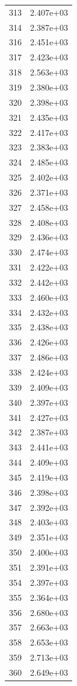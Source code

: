 \documentclass[12pt]{article}
\begin{document}
\begin{longtable}{@{}cc@{}}
313 & 2.407e+03 \\
314 & 2.387e+03 \\
316 & 2.451e+03 \\
317 & 2.423e+03 \\
318 & 2.563e+03 \\
319 & 2.380e+03 \\
320 & 2.398e+03 \\
321 & 2.435e+03 \\
322 & 2.417e+03 \\
323 & 2.383e+03 \\
324 & 2.485e+03 \\
325 & 2.402e+03 \\
326 & 2.371e+03 \\
327 & 2.458e+03 \\
328 & 2.408e+03 \\
329 & 2.436e+03 \\
330 & 2.474e+03 \\
331 & 2.422e+03 \\
332 & 2.442e+03 \\
333 & 2.460e+03 \\
334 & 2.432e+03 \\
335 & 2.438e+03 \\
336 & 2.426e+03 \\
337 & 2.486e+03 \\
338 & 2.424e+03 \\
339 & 2.409e+03 \\
340 & 2.397e+03 \\
341 & 2.427e+03 \\
342 & 2.387e+03 \\
343 & 2.441e+03 \\
344 & 2.409e+03 \\
345 & 2.419e+03 \\
346 & 2.398e+03 \\
347 & 2.392e+03 \\
348 & 2.403e+03 \\
349 & 2.351e+03 \\
350 & 2.400e+03 \\
351 & 2.391e+03 \\
354 & 2.397e+03 \\
355 & 2.364e+03 \\
356 & 2.680e+03 \\
357 & 2.663e+03 \\
358 & 2.653e+03 \\
359 & 2.713e+03 \\
360 & 2.649e+03 \\

\end{longtable}
\end{document}

